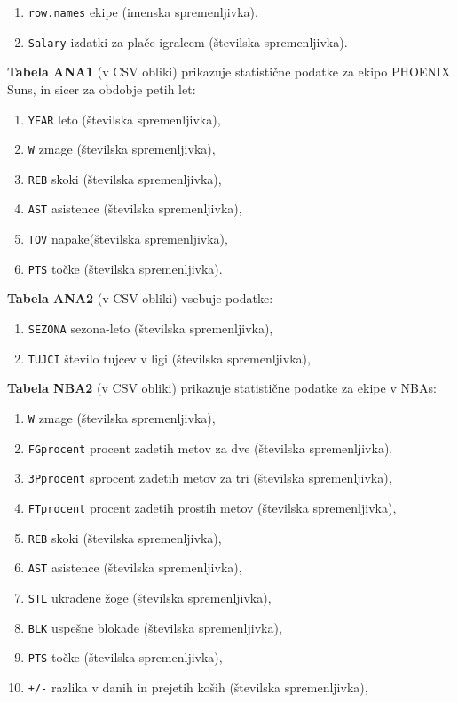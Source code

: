 \documentclass[11pt,a4paper]{article}
\begin{document}
\begin{enumerate}
\item{\verb|row.names| ekipe (imenska spremenljivka).}
\item{\verb|Salary| izdatki za plače igralcem (številska spremenljivka).}
\end{enumerate}

\smallskip
\textbf{Tabela ANA1} (v CSV obliki) prikazuje statistične podatke za ekipo PHOENIX Suns, in sicer za obdobje petih let:

\begin{enumerate}
\item{\verb|YEAR| leto (številska spremenljivka),}
\item{\verb|W| zmage (številska spremenljivka),}
\item{\verb|REB| skoki (številska spremenljivka),}
\item{\verb|AST| asistence (številska spremenljivka),}
\item{\verb|TOV| napake(številska spremenljivka),}
\item{\verb|PTS| točke (številska spremenljivka).}
\end{enumerate}

\smallskip
\textbf{Tabela ANA2} (v CSV obliki) vsebuje podatke:
\begin{enumerate}
\item{\verb|SEZONA| sezona-leto (številska spremenljivka),}
\item{\verb|TUJCI| število tujcev v ligi (številska spremenljivka),}
\end{enumerate}
\smallskip


\textbf{Tabela NBA2} (v CSV obliki) prikazuje statistične podatke za ekipe v NBAs:

\begin{enumerate}
\item{\verb|W| zmage (številska spremenljivka),}
\item{\verb|FGprocent| procent zadetih metov za dve (številska spremenljivka),}
\item{\verb|3Pprocent| sprocent zadetih metov za tri (številska spremenljivka),}
\item{\verb|FTprocent| procent zadetih prostih metov (številska spremenljivka),}
\item{\verb|REB| skoki (številska spremenljivka),}
\item{\verb|AST| asistence (številska spremenljivka),}
\item{\verb|STL| ukradene žoge (številska spremenljivka),}
\item{\verb|BLK| uspešne blokade (številska spremenljivka),}
\item{\verb|PTS| točke (številska spremenljivka),}
\item{\verb|+/-| razlika v danih in prejetih koših (številska spremenljivka),}
\end{enumerate}
\smallskip
\end{document}
